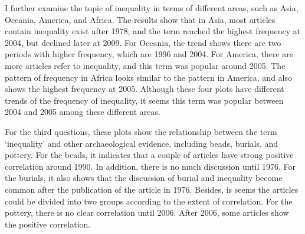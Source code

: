 \documentclass[10pt]{article}
\begin{document}
I further examine the topic of inequality in terms of different areas,
such as Asia, Oceania, America, and Africa. The results show that in
Asia, most articles contain inequality exist after 1978, and the term
reached the highest frequency at 2004, but declined later at 2009. For
Oceania, the trend shows there are two periods with higher frequency,
which are 1996 and 2004. For America, there are more articles refer to
inequality, and this term was popular around 2005. The pattern of
frequency in Africa looks similar to the pattern in America, and also
shows the highest frequency at 2005. Although these four plots have
different trends of the frequency of inequality, it seems this term was
popular between 2004 and 2005 among these different areas.

For the third questions, these plots show the relationship between the
term `inequality' and other archaeological evidence, including beads,
burials, and pottery. For the beads, it indicates that a couple of
articles have strong positive correlation around 1990. In addition,
there is no much discussion until 1976. For the burials, it also shows
that the discussion of burial and inequality become common after the
publication of the article in 1976. Besides, is seems the articles could
be divided into two groups according to the extent of correlation. For
the pottery, there is no clear correlation until 2006. After 2006, some
articles show the positive correlation.
\end{document}
